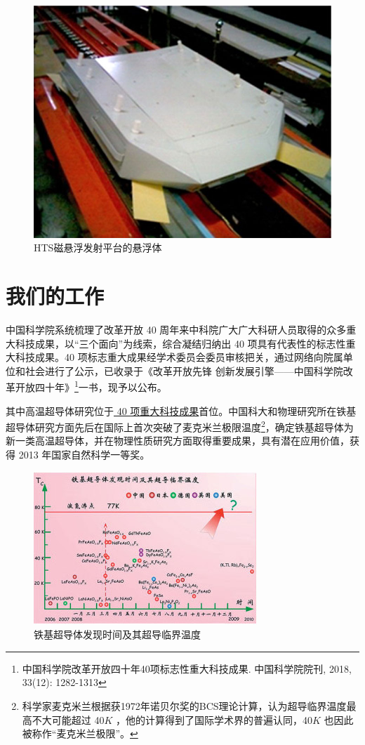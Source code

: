 \documentclass[UTF8, twocolumn]{ctexart}
\begin{document}
    \begin{figure}[ht]
        \centering
        \includegraphics[scale=0.8]{image/pan2010.jpg}
        \caption{HTS磁悬浮发射平台的悬浮体}
        \label{fig:image3}
    \end{figure}

\section{我们的工作}

    中国科学院系统梳理了改革开放 40 周年来中科院广大广大科研人员取得的众多重大科技成果，以“三个面向”为线索，综合凝结归纳出 40 项具有代表性的标志性重大科技成果。40 项标志重大成果经学术委员会委员审核把关，通过网络向院属单位和社会进行了公示，已收录于《改革开放先锋 创新发展引擎——中国科学院改革开放四十年》\footnote{中国科学院改革开放四十年40项标志性重大科技成果. 中国科学院院刊, 2018, 33(12): 1282-1313}一书，现予以公布。
    
    其中高温超导体研究位于\href{http://www.bulletin.cas.cn/publish_article/2018/12/20181202.htm}{ 40 项重大科技成果}首位。中国科大和物理研究所在铁基超导体研究方面先后在国际上首次突破了麦克米兰极限温度\footnote{科学家麦克米兰根据获1972年诺贝尔奖的BCS理论计算，认为超导临界温度最高不大可能超过 40$K$ ，他的计算得到了国际学术界的普遍认同，40$K$ 也因此被称作“麦克米兰极限”。}，确定铁基超导体为新一类高温超导体，并在物理性质研究方面取得重要成果，具有潜在应用价值，获得 2013 年国家自然科学一等奖。

    \begin{figure}[h]
        \centering
        \includegraphics[scale=0.8]{image/铁基超导体.jpg}
        \caption{铁基超导体发现时间及其超导临界温度}
        \label{fig:image4}
    \end{figure}
\end{document}
